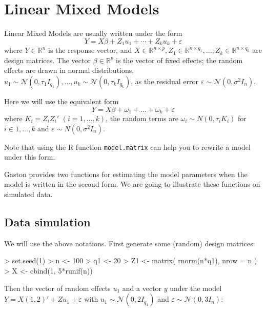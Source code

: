 \documentclass{article}
\let\epsilon\varepsilon
\renewenvironment{Schunk}{\vspace{\topsep}}{\vspace{\topsep}}
\begin{document}
\section{Linear Mixed Models}

\def\R{\mathbb{R}}
\def\N{\mathcal{N}}

  Linear Mixed Models are usually written under the form
  \begin{equation*}
    Y = X\beta + Z_1 u_1 + \cdots + Z_k u_k + \varepsilon
  \end{equation*}
  where $Y \in\R^{n}$ is the response vector, and $X\in \R^{n\times p}, Z_1 \in \R^{n\times q_1}, \dots, Z_k \in\R^{n\times q_k}$ are
  design matrices. The vector $\beta\in\R^p$ is the vector of fixed effects; the random effects are drawn in 
  normal distributions, $u_1\sim \N(0, \tau_1 I_{q_1}), \dots, u_k\sim \N(0, \tau_k I_{q_k})$, as the residual
  error $\epsilon\sim\N(0,\sigma^2 I_n)$.

  Here we will use the equivalent form 
  \begin{equation*}
    Y = X\beta + \omega_1 + \ldots + \omega_k + \varepsilon
  \end{equation*}
  where $K_i = Z_i Z_i'$ $(i = 1, \dots, k)$,
  the random terms are $\omega_i \sim N(0,\tau_i K_i)$ for $i \in 1, \dots,k$ and $\varepsilon \sim N(0,\sigma^2 I_n)$.

  Note that using the R function \verb!model.matrix! can help you to rewrite a model under this form.

  Gaston provides two functions for estimating the model parameters when the model is
  written in the second form. We are going to illustrate these functions on simulated
  data.

  \subsection{Data simulation}

  We will use the above notations. First generate some (random) design matrices:
 
\begin{Schunk}
\begin{Sinput}
> set.seed(1)
> n <- 100
> q1 <- 20
> Z1 <- matrix( rnorm(n*q1), nrow = n )
> X <- cbind(1, 5*runif(n))
\end{Sinput}
\end{Schunk}
 
  Then the vector of random effects $u_1$ and a vector $y$ under the model $Y = X (1,2)' + Z u_1 + \varepsilon$
  with $u_1 \sim \N(0, 2 I_{q_1})$ and $\varepsilon \sim\N(0, 3 I_n)$:
\end{document}
